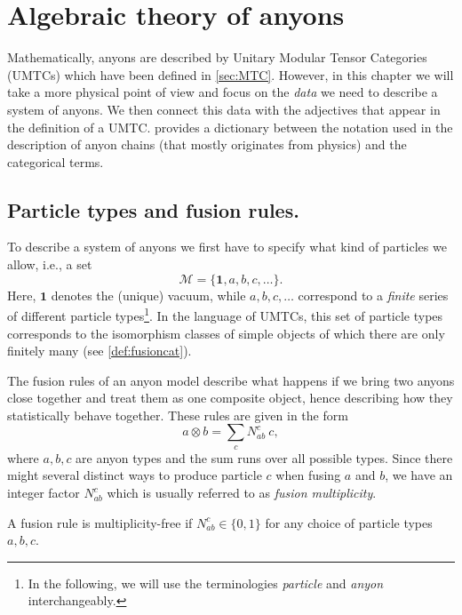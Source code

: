 \section{Algebraic theory of anyons}
\label{sec:alganyons}

Mathematically, anyons are described by Unitary Modular Tensor Categories (UMTCs) which have been defined in \cref{sec:MTC}. However, in this chapter we will take a more physical point of view and focus on the \emph{data} we need to describe a system of anyons. We then connect this data with the adjectives that appear in the definition of a UMTC.  provides a dictionary between the notation used in the description of anyon chains (that mostly originates from physics) and the categorical terms.

\subsection*{Particle types and fusion rules.}
To describe a system of anyons we first have to specify what kind of particles we allow, i.e., a set
	\begin{equation}
		\mathcal{M}=\{\mathbf{1},a,b,c,\dots\}.
	\end{equation}
Here, $\mathbf{1}$ denotes the (unique) vacuum, while $a,b,c,\dots$ correspond to a \emph{finite} series of different particle types\footnote{In the following, we will use the terminologies \emph{particle} and \emph{anyon} interchangeably.}. In the language of UMTCs, this set of particle types corresponds to the isomorphism classes of simple objects of which there are only finitely many (see \cref{def:fusioncat}).

The fusion rules of an anyon model describe what happens if we bring two anyons close together and treat them as one composite object, hence describing how they statistically behave together. These rules are given in the form
	\begin{equation}
	\label{eq:fusionrules}
		a\otimes b=\sum_c N_{ab}^c\ c,
	\end{equation}
where $a,b,c$ are anyon types and the sum runs over all possible types. Since there might several distinct ways to produce particle $c$ when fusing $a$ and $b$, we have an integer factor $N_{ab}^c$ which is usually referred to as \emph{fusion multiplicity}. 

	\begin{defn}
		A fusion rule is multiplicity-free if $N_{ab}^c\in\{0,1\}$ for any choice of particle types $a,b,c$.
	\end{defn}

